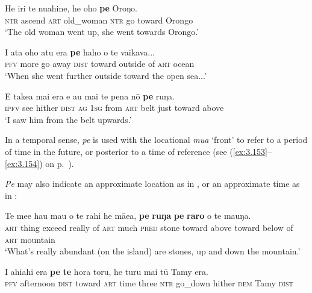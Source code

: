 \ea\label{ex:4.273}
\gll He iri te nuahine, he oho \textbf{pe} {\ꞌ}Ōroŋo. \\
\textsc{ntr} ascend \textsc{art} old\_woman \textsc{ntr} go toward Orongo \\

\glt 
‘The old woman went up, she went towards Orongo.’ \textstyleExampleref{[Ley-8-52.028]}
\z

\ea\label{ex:4.274}
\gll I {\ꞌ}ata oho atu era \textbf{pe} haho o te vaikava... \\
\textsc{pfv} more go away \textsc{dist} toward outside of \textsc{art} ocean \\

\glt 
‘When she went further outside toward the open sea...’ \textstyleExampleref{[R338.006]} 
\z

\ea\label{ex:4.275}
\gll E take{\ꞌ}a mai era e au mai te pena nō \textbf{pe} ruŋa. \\
\textsc{ipfv} see hither \textsc{dist} \textsc{ag} \textsc{1sg} from \textsc{art} belt just toward above \\

\glt
‘I saw him from the belt upwards.’ \textstyleExampleref{[R106.034]} 
\z

In a temporal sense, \textit{pe} is used with the locational \textit{mu{\ꞌ}a} ‘front’ to refer to a period of time in the future, or posterior to a time of reference (see (\ref{ex:3.153}–\ref{ex:3.154}) on p.~\pageref{ex:3.153}). 

\textit{Pe} may also indicate an approximate location as in , or an approximate time as in :

\ea\label{ex:4.276}
\gll Te me{\ꞌ}e hau mau o te rahi he mā{\ꞌ}ea, \textbf{pe} \textbf{ruŋa} \textbf{pe} \textbf{raro} o te ma{\ꞌ}uŋa.\\
\textsc{art} thing exceed really of \textsc{art} much \textsc{pred} stone toward above toward below of \textsc{art} mountain\\

\glt 
‘What’s really abundant (on the island) are stones, up and down the mountain.’ \textstyleExampleref{[R350.011]} 
\z

\ea\label{ex:4.277}
\gll I ahiahi era \textbf{pe} \textbf{te} hora toru, he turu mai tū Tamy era.\\
\textsc{pfv} afternoon \textsc{dist} toward \textsc{art} time three \textsc{ntr} go\_down hither \textsc{dem} Tamy \textsc{dist}\\


